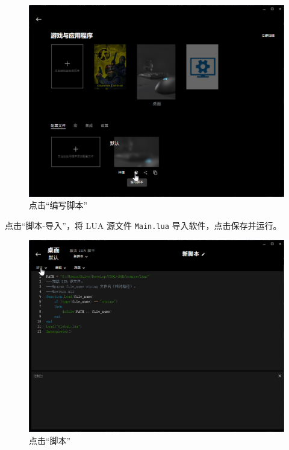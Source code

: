 \begin{figure}[H]
    \Centering
    \includegraphics[width=\textwidth]{docs/assets/script.png}
    \caption{点击“编写脚本”}
\end{figure}

点击“脚本-导入”，将 LUA 源文件 \lstinline{Main.lua} 导入软件，点击保存并运行。

\begin{figure}[H]
    \Centering
    \includegraphics[width=\textwidth]{docs/assets/edit.png}
    \caption{点击“脚本”}
\end{figure}

